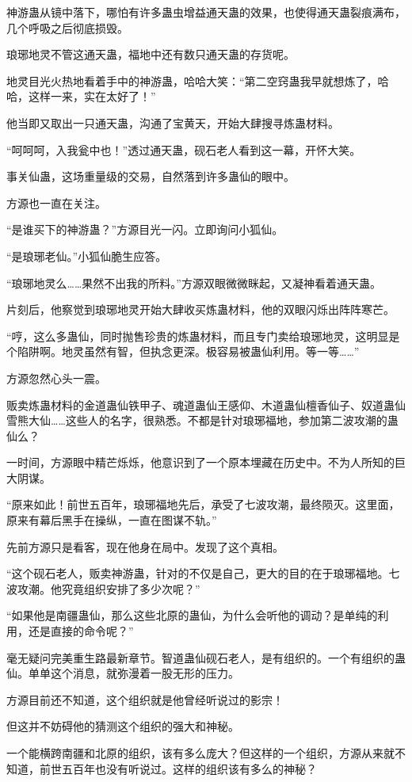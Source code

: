 \begin{this_body}
神游蛊从镜中落下，哪怕有许多蛊虫增益通天蛊的效果，也使得通天蛊裂痕满布，几个呼吸之后彻底损毁。

琅琊地灵不管这通天蛊，福地中还有数只通天蛊的存货呢。

地灵目光火热地看着手中的神游蛊，哈哈大笑：“第二空窍蛊我早就想炼了，哈哈，这样一来，实在太好了！”

他当即又取出一只通天蛊，沟通了宝黄天，开始大肆搜寻炼蛊材料。

“呵呵呵，入我瓮中也！”透过通天蛊，砚石老人看到这一幕，开怀大笑。

事关仙蛊，这场重量级的交易，自然落到许多蛊仙的眼中。

方源也一直在关注。

“是谁买下的神游蛊？”方源目光一闪。立即询问小狐仙。

“是琅琊老仙。”小狐仙脆生应答。

“琅琊地灵么……果然不出我的所料。”方源双眼微微眯起，又凝神看着通天蛊。

片刻后，他察觉到琅琊地灵开始大肆收买炼蛊材料，他的双眼闪烁出阵阵寒芒。

“哼，这么多蛊仙，同时抛售珍贵的炼蛊材料，而且专门卖给琅琊地灵，这明显是个陷阱啊。地灵虽然有智，但执念更深。极容易被蛊仙利用。等一等……”

方源忽然心头一震。

贩卖炼蛊材料的金道蛊仙铁甲子、魂道蛊仙王感仰、木道蛊仙檀香仙子、奴道蛊仙雪熊大仙……这些人的名字，很熟悉。不都是针对琅琊福地，参加第二波攻潮的蛊仙么？

一时间，方源眼中精芒烁烁，他意识到了一个原本埋藏在历史中。不为人所知的巨大阴谋。

“原来如此！前世五百年，琅琊福地先后，承受了七波攻潮，最终陨灭。这里面，原来有幕后黑手在操纵，一直在图谋不轨。”

先前方源只是看客，现在他身在局中。发现了这个真相。

“这个砚石老人，贩卖神游蛊，针对的不仅是自己，更大的目的在于琅琊福地。七波攻潮。他究竟组织安排了多少次呢？”

“如果他是南疆蛊仙，那么这些北原的蛊仙，为什么会听他的调动？是单纯的利用，还是直接的命令呢？”

毫无疑问完美重生路最新章节。智道蛊仙砚石老人，是有组织的。一个有组织的蛊仙。单单这个消息，就弥漫着一股无形的压力。

方源目前还不知道，这个组织就是他曾经听说过的影宗！

但这并不妨碍他的猜测这个组织的强大和神秘。

一个能横跨南疆和北原的组织，该有多么庞大？但这样的一个组织，方源从来就不知道，前世五百年也没有听说过。这样的组织该有多么的神秘？


\end{this_body}
